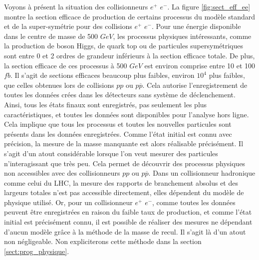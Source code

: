    \medskip
   
   Voyons \`a pr\'esent la situation des collisionneurs $e^+$ $e^-$. La figure \ref{fig:sect_eff_ee} montre la section efficace de production de certains processus du mod\`ele standard et de la super-sym\'etrie pour des collisions $e^+$ $e^-$. Pour une \'energie disponible dans le centre de masse de 500 $GeV$, les processus physiques int\'eressants, comme la production de boson Higgs, de quark top ou de particules supersym\'etriques sont entre 0 et 2 ordres de grandeur inf\'erieurs \`a la section efficace totale. De plus, la section efficace de ces processus \`a 500 $GeV$ est environ comprise entre 10 et 100 $fb$. Il s'agit de sections efficaces beaucoup plus faibles, environ $10^4$ plus faibles, que celles obtenues lors de collisions $pp$ ou $p\overline{p}$. Cela autorise l'enregistrement de toutes les donn\'ees cr\'ees dans les d\'etecteurs sans syst\`eme de d\'eclenchement. Ainsi, tous les \'etats finaux sont enregistr\'es, pas seulement les plus caract\'eristiques, et toutes les donn\'ees sont disponibles pour l'analyse hors ligne. Cela implique que tous les processus et toutes les nouvelles particules sont pr\'esents dans les donn\'ees enregistr\'ees. Comme l'\'etat initial est connu avec pr\'ecision, la mesure de la masse manquante est alors r\'ealisable pr\'ecis\'ement. Il s'agit d'un atout consid\'erable lorsque l'on veut mesurer des particules n'interagissant que très peu. Cela permet de d\'ecouvrir des processus physiques non accessibles avec des collisionneurs $pp$ ou $p\overline{p}$. Dans un collisionneur hadronique comme celui du LHC, la mesure des rapports de branchement absolus et des largeurs totales n'est pas accessible directement, elles d\'ependent du mod\`ele de physique utilis\'e. Or, pour un collisionneur $e^+$ $e^-$, comme toutes les donn\'ees peuvent \^etre enregistr\'ees en raison du faible taux de production, et comme l'\'etat initial est pr\'ecis\'ement connu, il est possible de r\'ealiser des mesures ne d\'ependant d'aucun mod\`ele gr\^ace \`a la m\'ethode de la masse de recul. Il s'agit l\`a d'un atout non n\'egligeable. Non expliciterons cette m\'ethode dans la section \ref{sect:prog_physique}.
   
   \medskip
   
